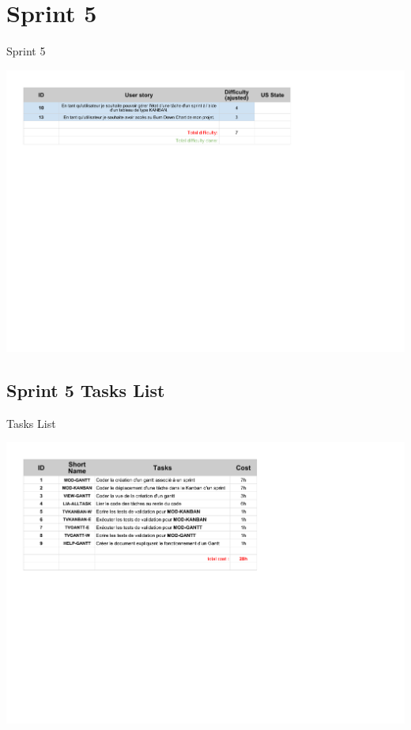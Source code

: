 \documentclass{beamer}
\begin{document}
\section{Sprint 5}

\begin{frame}{Sprint 5}
	\begin{center}
        \includegraphics[scale=0.55]{Sprint5.pdf}
        \end{center}
\end{frame}

\subsection{Sprint 5 Tasks List}

\begin{frame}{Tasks List}
	\begin{center}
        \includegraphics[scale=0.52]{Sprint5TasksList.pdf}
        \end{center}
\end{frame}
\end{document}
